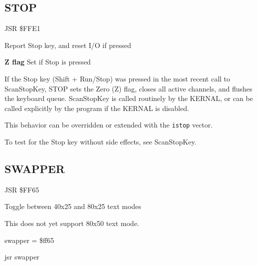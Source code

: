 \subsection{STOP}
\label{KERNAL Jump Table!STOP}
\begin{description}[leftmargin=2cm,style=nextline]
    \item [Address:] JSR \$FFE1
    \item [Description:] Report Stop key, and reset I/O if pressed
    \item [Outputs:]
        \textbf{Z flag} Set if Stop is pressed
    \item [Remarks:]
        If the Stop key (Shift + Run/Stop) was pressed in the most recent call to ScanStopKey, STOP sets the Zero (Z) flag, closes all active channels, and flushes the keyboard queue. ScanStopKey is called routinely by the KERNAL, or can be called explicitly by the program if the KERNAL is disabled.

        This behavior can be overridden or extended with the \texttt{istop} vector.

        To test for the Stop key without side effects, see ScanStopKey.
    \item [Example:]
\end{description}



\newpage
\subsection{SWAPPER}
\label{KERNAL Jump Table!SWAPPER}
\begin{description}[leftmargin=2cm,style=nextline]
    \item [Address:] JSR \$FF65
    \item [Description:] Toggle between 40x25 and 80x25 text modes
    \item [Remarks:]
        This does not yet support 80x50 text mode.
    \item [Example:]
swapper = \$ff65

    jsr swapper
\end{description}



